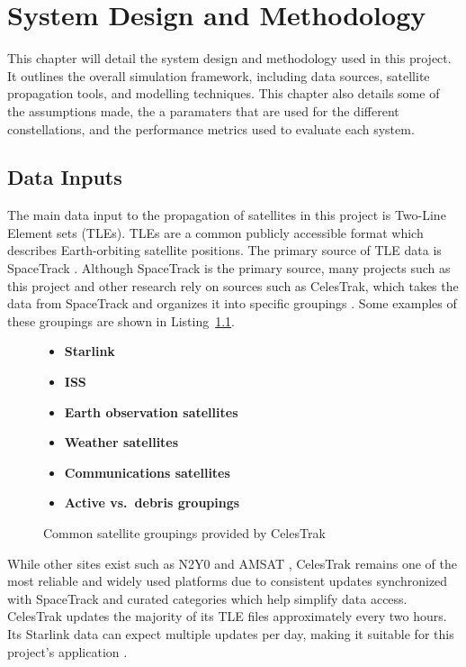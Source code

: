 \chapter{System Design and Methodology} \label{chapter:3}

This chapter will detail the system design and methodology used in this project. It outlines the overall simulation framework, including data sources, satellite propagation tools, and modelling techniques. This chapter also details some of the assumptions made, the a paramaters that are used for the different constellations, and the performance metrics used to evaluate each system.

\section{Data Inputs}
The main data input to the propagation of satellites in this project is Two-Line Element sets (TLEs). TLEs are a common publicly accessible format which describes Earth-orbiting satellite positions. The primary source of TLE data is SpaceTrack \cite{spacetrack}. Although SpaceTrack is the primary source, many projects such as this project and other research rely on sources such as CelesTrak, which takes the data from SpaceTrack and organizes it into specific groupings \cite{celestrakTLE}. Some examples of these groupings are shown in Listing~\ref{list:satellite_categories}.

\begin{figure}[ht]
\centering
\begin{minipage}{0.6\linewidth}
\begin{itemize}
    \item \textbf{Starlink}
    \item \textbf{ISS}
    \item \textbf{Earth observation satellites}
    \item \textbf{Weather satellites}
    \item \textbf{Communications satellites}
    \item \textbf{Active vs.\ debris groupings}
\end{itemize}
\end{minipage}
\caption{Common satellite groupings provided by CelesTrak}
\label{list:satellite_categories}
\end{figure}

While other sites exist such as N2Y0 \cite{N2YO} and AMSAT \cite{AMSAT}, CelesTrak \cite{celestrakTLE} remains one of the most reliable and widely used platforms due to consistent updates synchronized with SpaceTrack and curated categories which help simplify data access. CelesTrak updates the majority of its TLE files approximately every two hours. Its Starlink data can expect multiple updates per day, making it suitable for this project's application \cite{usradioguyNewTLE}.

